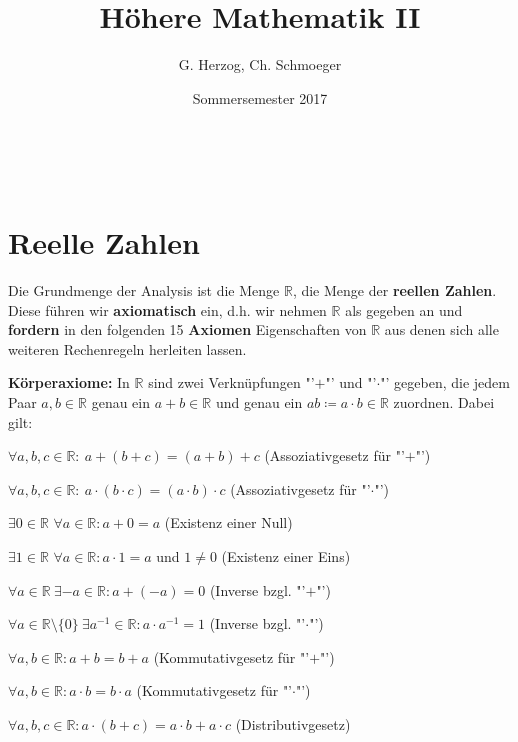 \documentclass[12pt]{extreport} %
\title{Höhere Mathematik II}
\author{G. Herzog, Ch. Schmoeger}
\date{Sommersemester 2017}
\makeatletter
\newcommand{\R}{\mathbb{R}}
\theoremstyle{named}
\theoremstyle{itshape}
\theoremstyle{normal}
\def\maketitle{ \begin{titlepage} 
			~\vspace{3cm} 
		\begin{center} {\Huge \@title} \end{center} 
	 		\vspace*{1cm} 
	 	\begin{center} {\large \@author} \end{center} 
	 	\begin{center} \@date \end{center} 
	 		\vspace*{7cm} 
	 	\begin{center} \@publishers \end{center} 
	 		\vfill 
	\end{titlepage} }
\makeatother
\begin{document}
\begin{titlepage}
	\maketitle
	\thispagestyle{empty}
\end{titlepage}
	
\tableofcontents
\thispagestyle{empty}
  
\chapter{Reelle Zahlen}

Die Grundmenge der Analysis ist die Menge $\R$, die Menge der \textbf{reellen Zahlen}. Diese führen wir \textbf{axiomatisch} ein, d.h. wir nehmen $\R$ als gegeben an und 
\textbf{fordern} in den folgenden 15 \textbf{Axiomen} Eigenschaften von $\R$ aus denen sich alle weiteren Rechenregeln herleiten lassen.  

\bigskip
\bigskip

\textbf{Körperaxiome:} In $\R$ sind zwei Verknüpfungen "'$+$"' und "'$\cdot$"' gegeben, die jedem Paar $a, b \in \R$ genau ein $a + b \in \R$ und genau ein 
$a b \coloneqq a \cdot b \in \R$ zuordnen. Dabei gilt:
\begin{description} \addtolength{\itemindent}{0.4cm} \label{k.axiom}
	\item[$(A1)$] $\forall a, b, c \in \R: \: a + \left( b + c \right) = \left( a + b \right) + c$  (Assoziativgesetz für "'$+$"') \label{k.axiom-a1}
	\item[$(A5)$] $\forall a, b, c \in \R: \: a \cdot \left( b \cdot c \right) = \left( a \cdot b \right) \cdot c$ (Assoziativgesetz für "'$\cdot$"') \label{k.axiom-a5}
	\item[$(A2)$] $\exists 0 \in \R$ $\forall a \in \R : a + 0 = a$ (Existenz einer Null) \label{k.axiom-a2}
	\item[$(A6)$] $\exists 1 \in \R$ $\forall a \in \R : a \cdot 1 = a$ und $1 \neq 0$ (Existenz einer Eins) \label{k.axiom-a6}
	\item[$(A3)$] $\forall a \in \R ~ \exists -a \in \R : a + (-a) = 0$ (Inverse bzgl. "'$+$"')  \label{k.axiom-a3} 
	\item[$(A7)$] $\forall a \in \R \setminus \{ 0 \} ~ \exists a^{-1} \in \R : a \cdot a^{-1} = 1$ (Inverse bzgl. "'$\cdot$"')  \label{k.axiom-a7}
	\item[$(A4)$] $\forall a, b \in \R : a + b = b + a$ (Kommutativgesetz für "'$+$"') \label{k.axiom-a4}
	\item[$(A8)$] $\forall a, b \in \R : a \cdot b = b \cdot a$ (Kommutativgesetz für "'$\cdot$"') \label{k.axiom-a8}
	\item[$(A9)$] $\forall a, b, c \in \R : a \cdot (b + c) = a \cdot b + a \cdot c$ (Distributivgesetz) \label{k.axiom-a9}
\end{description}
\end{document}
